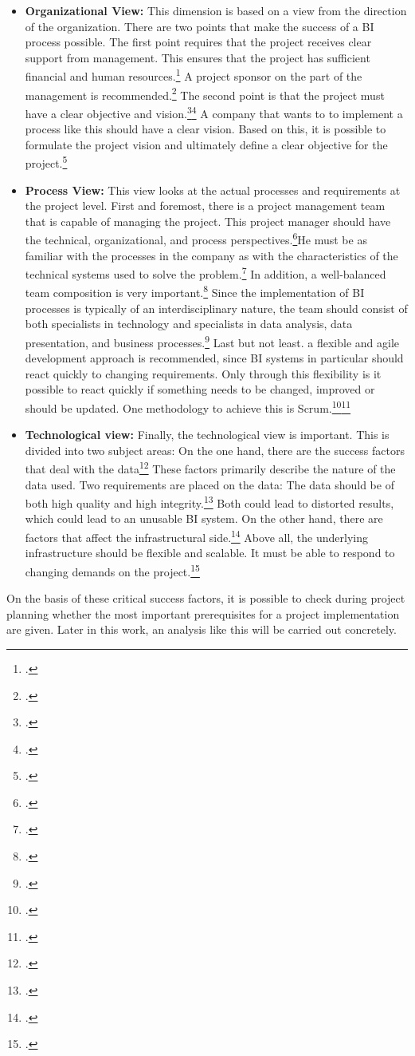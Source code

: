 \begin{itemize}
    \item \textbf{Organizational View: }This dimension is based on a view from the direction of the organization.
    There are two points that make the success of a \ac{BI} process possible. The first point requires that the project
    receives clear support from management. This ensures that the project has sufficient financial and human resources.\footcite[Cf.][p. 98]{watson2007current}
    A project sponsor on the part of the management is recommended.\footcite[Cf.][pp. 87]{yeoh2008managing}
    The second point is that the project must have a clear objective and vision.\footcite[Cf.][pp. 87]{yeoh2008managing}\footcite[Cf.][p. 50]{villamarin2017key}
    A company that wants to to implement a process like this should have a clear vision.
    Based on this, it is possible to formulate the project vision and ultimately define a clear
    objective for the project.\footcite[Cf.][pp. 87]{yeoh2008managing}
    \item \textbf{Process View: }This view looks at the actual processes and requirements at the project level.
    First and foremost, there is a project management team that is capable of managing the project. This project manager should have the
    technical, organizational, and process perspectives.\footcite[Cf.][p. 27]{yeoh2010critical}He must be as familiar with the
    processes in the company as with the characteristics of the technical systems used to solve the problem.\footcite[Cf.][pp. 88]{yeoh2008managing}
    In addition, a well-balanced team composition is very important.\footcite[Cf.][pp. 87]{yeoh2008managing}
    Since the implementation of BI processes is typically of an
    interdisciplinary nature, the team should consist of both specialists in technology and specialists in
    data analysis, data presentation, and business processes.\footcite[Cf.][Fig. 7]{muntean2013agile} Last but not least.
    a flexible and agile development approach is recommended, since \ac{BI} systems in particular should react quickly to changing requirements.
    Only through this flexibility is it possible to react quickly if something needs to be changed, improved
    or should be updated. One methodology to achieve this is
    Scrum.\footcite[Cf.][p. 164]{isik2011business}\footcite[Cf.][p. 3817]{knabke2013understanding}
    \item \textbf{Technological view: }Finally, the technological view is important. This is divided into two
    subject areas: On the one hand, there are the success factors that deal with the data\footcite[Cf.][Fig. 1]{yeoh2010critical}
    These factors primarily describe the nature of the data used.
    Two requirements are placed on the data: The data should be of both high quality and high
    integrity.\footcite[Cf.][p. 163]{isik2011business} Both could lead to distorted results,
    which could lead to an unusable BI system. On the other hand, there are factors that affect the infrastructural side.\footcite[Cf.][Fig. 1]{yeoh2010critical}
    Above all, the underlying infrastructure should be flexible and
    scalable. It must be able to respond to changing demands on the project.\footcite[Cf.][pp. 89]{yeoh2008managing}
\end{itemize}

On the basis of these critical success factors, it is possible to check during project planning whether the most important
prerequisites for a project implementation are given. Later in this work, an analysis like this will be carried out concretely.